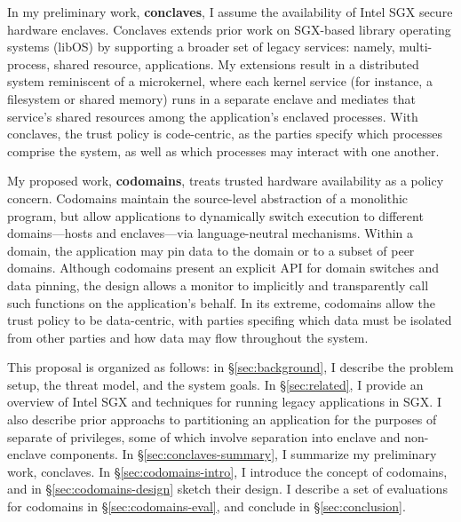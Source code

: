 %
In my preliminary work, \textbf{conclaves}, I assume the availability of Intel
SGX secure hardware enclaves.
%
Conclaves extends prior work on SGX-based library operating systems (libOS) by
supporting a broader set of legacy services: namely, multi-process, shared
resource, applications.
%
My extensions result in a distributed system reminiscent of a microkernel,
where each kernel service (for instance, a filesystem or shared memory)
runs in a separate enclave and mediates that service’s shared resources
among the application's enclaved processes.
%
With conclaves, the trust policy is code-centric, as the parties specify which
processes comprise the system, as well as which processes may interact with one
another.


My proposed work, \textbf{codomains}, treats trusted hardware availability as a
policy concern.
%
Codomains maintain the source-level abstraction of a monolithic program, but
allow applications to dynamically switch execution to different domains---hosts
and enclaves---via language-neutral mechanisms.
%
Within a domain, the application may pin data to the domain or to a subset of
peer domains.
%
Although codomains present an explicit API for domain switches and data
pinning, the design allows a monitor to implicitly and transparently call such
functions on the application's behalf.
%
In its extreme, codomains allow the trust policy to be data-centric, with parties
specifing which data must be isolated from other parties and how data may flow
throughout the system.


This proposal is organized as follows: in \S\ref{sec:background}, I describe
the problem setup, the threat model, and the system goals.
%
In \S\ref{sec:related}, I provide an overview of Intel SGX  and techniques for
running legacy applications in SGX\@.
%
I also describe prior approachs to partitioning an application for the
purposes of separate of privileges, some of which involve separation
into enclave and non-enclave components.
%
In \S\ref{sec:conclaves-summary}, I summarize my preliminary work, conclaves.
%
In \S\ref{sec:codomains-intro}, I introduce the concept of codomains, and in
\S\ref{sec:codomains-design} sketch their design.
%
I describe a set of evaluations for codomains in \S\ref{sec:codomains-eval},
and conclude in \S\ref{sec:conclusion}.
